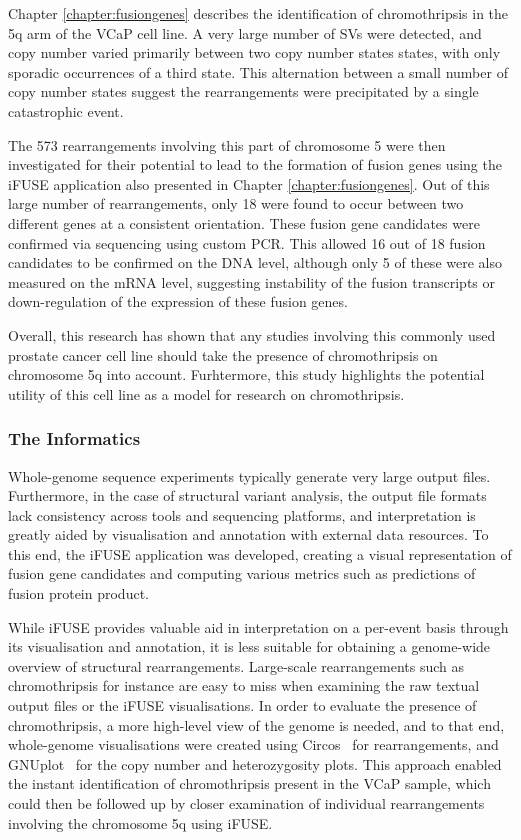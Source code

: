 Chapter \ref{chapter:fusiongenes} describes the identification of chromothripsis in the 5q arm of the VCaP cell line. A very large number of SVs were detected, and copy number varied primarily between two copy number states states, with only sporadic occurrences of a third state. This alternation between a small number of copy number states suggest the rearrangements were precipitated by a single catastrophic event.

The 573 rearrangements involving this part of chromosome 5 were then investigated for their potential to lead to the formation of fusion genes using the iFUSE application also presented in Chapter \ref{chapter:fusiongenes}. Out of this large number of rearrangements, only 18 were found to occur between two different genes at a consistent orientation. These fusion gene candidates were confirmed via sequencing using custom PCR. This allowed 16 out of 18 fusion candidates to be confirmed on the DNA level, although only 5 of these were also measured on the mRNA level, suggesting instability of the fusion transcripts or down-regulation of the expression of these fusion genes.

Overall, this research has shown that any studies involving this commonly used prostate cancer cell line should take the presence of chromothripsis on chromosome 5q into account. Furhtermore, this study highlights the potential utility of this cell line as a model for research on chromothripsis.

\subsubsection{The Informatics}
Whole-genome sequence experiments typically generate very large output files. Furthermore, in the case of structural variant analysis, the output file formats lack consistency across tools and sequencing platforms, and interpretation is greatly aided by visualisation and annotation with external data resources. To this end, the iFUSE application was developed, creating a visual representation of fusion gene candidates and computing various metrics such as predictions of fusion protein product.

While iFUSE provides valuable aid in interpretation on a per-event basis through its visualisation and annotation, it is less suitable for obtaining a genome-wide overview of structural rearrangements. Large-scale rearrangements such as chromothripsis for instance are easy to miss when examining the raw textual output files or the iFUSE visualisations. In order to evaluate the presence of chromothripsis, a more high-level view of the genome is needed, and to that end, whole-genome visualisations were created using Circos~\cite{circos} for rearrangements, and GNUplot~\cite{url-gnuplot} for the copy number and heterozygosity plots. This approach enabled the instant identification of chromothripsis present in the VCaP sample, which could then be followed up by closer examination of individual rearrangements involving the chromosome 5q using iFUSE.

